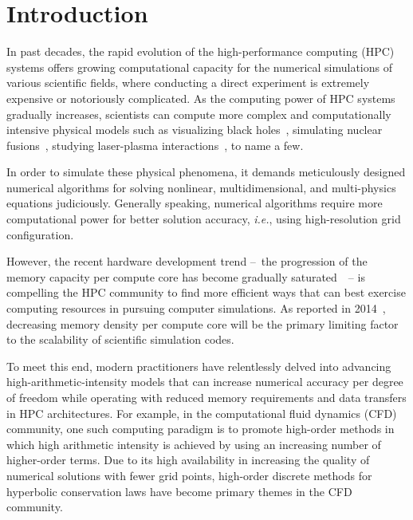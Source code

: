 \chapter{Introduction}\label{chap:introduction}

In past decades, the rapid evolution of the high-performance computing (HPC) systems
offers growing computational capacity for the numerical simulations of various scientific fields,
where conducting a direct experiment is extremely expensive or notoriously complicated.
As the computing power of HPC systems gradually increases,
scientists can compute more complex and computationally intensive physical models such as
visualizing black holes~\cite{james2015gravitational,alberdi2019first},
simulating nuclear fusions~\cite{haines2016detailed,gaffney2019making},
studying laser-plasma interactions~\cite{meinecke2014turbulent,tzeferacos2018laboratory},
to name a few.

In order to simulate these physical phenomena,
it demands meticulously designed numerical algorithms for solving
nonlinear, multidimensional, and multi-physics equations judiciously.
Generally speaking, numerical algorithms require more computational power for better solution accuracy,
\textit{i.e.}, using high-resolution grid configuration.

However, the recent hardware development trend
--~the progression of the memory capacity per compute core has become gradually saturated~\cite{attig2011trends}~--
is compelling the HPC community to find more efficient ways
that can best exercise computing resources in pursuing computer simulations.
As reported in 2014~\cite{dongarra2014applied}, decreasing memory density per compute core
will be the primary limiting factor to the scalability of scientific simulation codes.

To meet this end, modern practitioners have relentlessly delved into advancing
high-arithmetic-intensity models that can increase numerical accuracy per degree of freedom
while operating with reduced memory requirements and data transfers in HPC architectures.
For example, in the computational fluid dynamics (CFD) community,
one such computing paradigm is to promote high-order methods in which high arithmetic intensity is achieved
by using an increasing number of higher-order terms.
Due to its high availability in increasing the quality of numerical solutions with fewer grid points,
high-order discrete methods for hyperbolic conservation laws have become primary themes in the CFD community.

